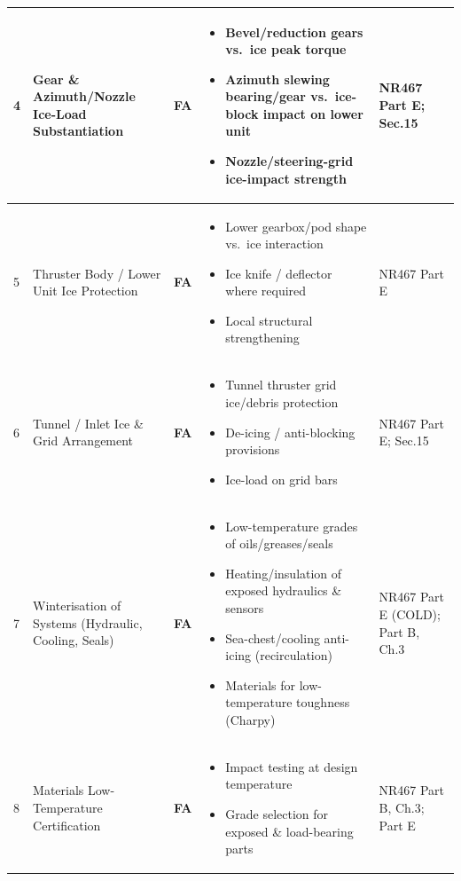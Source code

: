 \documentclass[11pt,a4paper]{report}
\newcommand{\fa}{\textbf{\textcolor{warningred}{FA}}}
\begin{document}
\begin{longtable}{|p{0.5cm}|p{5cm}|p{1.5cm}|p{5.5cm}|p{2cm}|}
4 & Gear \& Azimuth/Nozzle Ice-Load Substantiation & \fa{} &
\begin{itemize}[leftmargin=*,nosep]
\item Bevel/reduction gears vs.\ ice peak torque
\item Azimuth slewing bearing/gear vs.\ ice-block impact on lower unit
\item Nozzle/steering-grid ice-impact strength
\end{itemize} & NR467 Part E; Sec.15 \\
\hline

5 & Thruster Body / Lower Unit Ice Protection & \fa{} &
\begin{itemize}[leftmargin=*,nosep]
\item Lower gearbox/pod shape vs.\ ice interaction
\item Ice knife / deflector where required
\item Local structural strengthening
\end{itemize} & NR467 Part E \\
\hline

6 & Tunnel / Inlet Ice \& Grid Arrangement & \fa{} &
\begin{itemize}[leftmargin=*,nosep]
\item Tunnel thruster grid ice/debris protection
\item De-icing / anti-blocking provisions
\item Ice-load on grid bars
\end{itemize} & NR467 Part E; Sec.15 \\
\hline

7 & Winterisation of Systems (Hydraulic, Cooling, Seals) & \fa{} &
\begin{itemize}[leftmargin=*,nosep]
\item Low-temperature grades of oils/greases/seals
\item Heating/insulation of exposed hydraulics \& sensors
\item Sea-chest/cooling anti-icing (recirculation)
\item Materials for low-temperature toughness (Charpy)
\end{itemize} & NR467 Part E (COLD); Part B, Ch.3 \\
\hline

8 & Materials Low-Temperature Certification & \fa{} &
\begin{itemize}[leftmargin=*,nosep]
\item Impact testing at design temperature
\item Grade selection for exposed \& load-bearing parts
\end{itemize} & NR467 Part B, Ch.3; Part E \\
\hline


\end{longtable}
\end{document}
